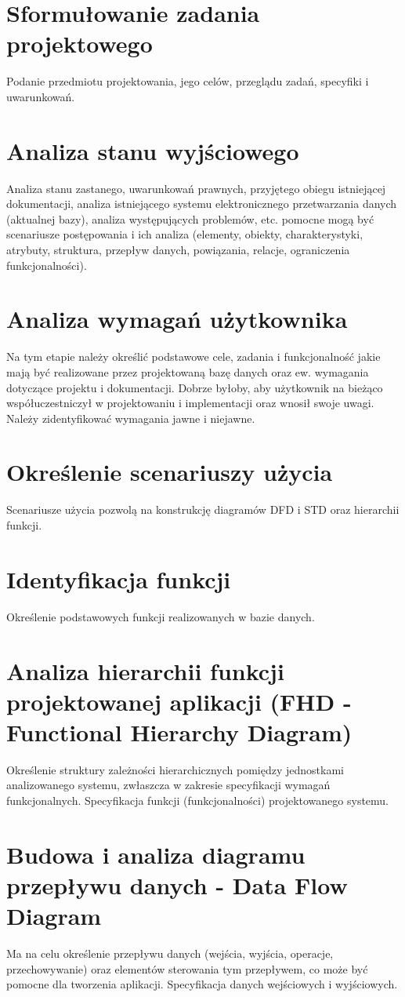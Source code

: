 \section{Sformułowanie zadania projektowego}
Podanie przedmiotu projektowania, jego celów,
przeglądu zadań, specyfiki i uwarunkowań.
\section{Analiza stanu wyjściowego}
Analiza stanu zastanego, uwarunkowań prawnych, przyjętego
obiegu istniejącej dokumentacji, analiza istniejącego systemu elektronicznego
przetwarzania danych (aktualnej bazy), analiza występujących problemów, etc. pomocne
mogą być scenariusze postępowania i ich analiza (elementy, obiekty, charakterystyki,
atrybuty, struktura, przepływ danych, powiązania, relacje, ograniczenia funkcjonalności).
\section{Analiza wymagań użytkownika}
Na tym etapie należy określić podstawowe
cele, zadania i funkcjonalność jakie mają być realizowane przez projektowaną bazę danych
oraz ew. wymagania dotyczące projektu i dokumentacji. Dobrze byłoby, aby użytkownik
na bieżąco współuczestniczył w projektowaniu i implementacji oraz wnosił swoje uwagi.
Należy zidentyfikować wymagania jawne i niejawne.
\section{Określenie scenariuszy użycia}
Scenariusze użycia pozwolą na konstrukcję diagramów
DFD i STD oraz hierarchii funkcji.
\section{Identyfikacja funkcji}
Określenie podstawowych funkcji realizowanych w bazie danych.
\section{Analiza hierarchii funkcji projektowanej aplikacji (FHD - Functional Hierarchy
Diagram)}
Określenie struktury zależności hierarchicznych pomiędzy jednostkami
analizowanego systemu, zwłaszcza w zakresie specyfikacji wymagań funkcjonalnych.
Specyfikacja funkcji (funkcjonalności) projektowanego systemu.
\section{Budowa i analiza diagramu przepływu danych - Data Flow Diagram }
Ma na celu określenie przepływu danych (wejścia, wyjścia, operacje, przechowywanie) oraz
elementów sterowania tym przepływem, co może być pomocne dla tworzenia aplikacji.
Specyfikacja danych wejściowych i wyjściowych.

